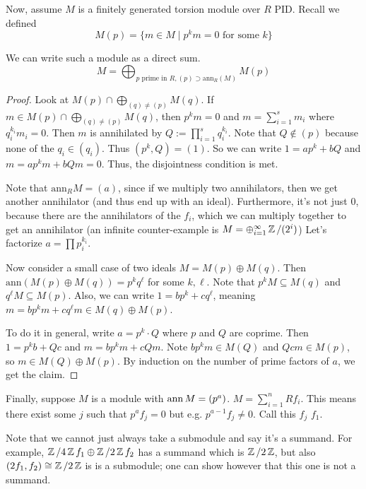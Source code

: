 Now, assume $M$ is a finitely generated torsion module over $R$ PID. Recall we defined
\[ M(p) = \{ m \in M \mid p^k m = 0 \text{ for some $k$} \} \]
\begin{theorem}
    We can write such a module as a direct sum.
    \[ M = \bigoplus_{p \text{ prime in } R, (p) \supset \text{ann}_R (M)} M(p) \]
    \begin{proof}
        Look at $M(p) \cap \bigoplus_{(q) \neq (p)} M(q)$. If $m \in M(p) \cap \bigoplus_{(q) \neq (p)} M(q)$,
        then $p^k m = 0$ and $m = \sum_{i = 1}^s m_i$ where $q_i^{k_i} m_i = 0$. Then $m$ is annihilated by $Q := \prod_{i = 1}^s q_i^{k_i}$.
        Note that $Q \notin (p)$ because none of the $q_i \in (q_i)$. Thus $(p^k, Q) = (1)$. So we can write $1 = ap^k + bQ$ and $m = ap^k m + bQm = 0$.
        Thus, the disjointness condition is met.

        Note that $\text{ann}_R M = (a)$, since if we multiply two annihilators, then we get another annihilator (and thus end up with an ideal).
        Furthermore, it's not just $0$, because there are the annihilators of the $f_i$, which we can multiply together to get an annihilator (an infinite counter-example is $M = \oplus_{i = 1}^{\infty} \operatorname{\mathbb{Z}}/(2^i)$)
        Let's factorize $a = \prod p_i^{k_i}$.

        Now consider a small case of two ideals $M = M(p) \oplus M(q)$. Then $\text{ann}(M(p) \oplus M(q)) = p^k q^{\ell}$ for some $k, \ell$.
        Note that $p^k M \subseteq M(q)$ and $q^{\ell} M \subseteq M(p)$. Also, we can write $1 = bp^k + c q^{\ell}$, meaning
        $m = bp^k m + c q^{\ell} m \in M(q) \oplus M(p)$.
        
        To do it in general, write $a = p^k \cdot Q$ where $p$ and $Q$ are coprime. Then $1 = p^k b + Qc$ and $m = b p^k m + c Qm$.
        Note $b p^k m \in M(Q)$ and $Qcm \in M(p)$, so $m \in M(Q) \oplus M(p)$. By induction on the number of prime factors of $a$, we get the claim.
    \end{proof}
\end{theorem}

Finally, suppose $M$ is a module with $\operatorname{ann} M = (p^a)$. $M = \sum_{i = 1}^n R f_i$. This means there exist some $j$
such that $p^a f_j = 0$ but e.g. $p^{a - 1} f_j \neq 0$. Call this $f_j$ $f_1$.

Note that we cannot just always take a submodule
and say it's a summand. For example, $\operatorname{\mathbb{Z}}/4\operatorname{\mathbb{Z}} f_1 \oplus \operatorname{\mathbb{Z}}/2\operatorname{\mathbb{Z}} f_2$ has a summand which is $\operatorname{\mathbb{Z}}/2\operatorname{\mathbb{Z}}$, but also $(2 f_1, f_2) \cong \operatorname{\mathbb{Z}}/2\operatorname{\mathbb{Z}}$ is is a submodule;
one can show however that this one is not a summand.

